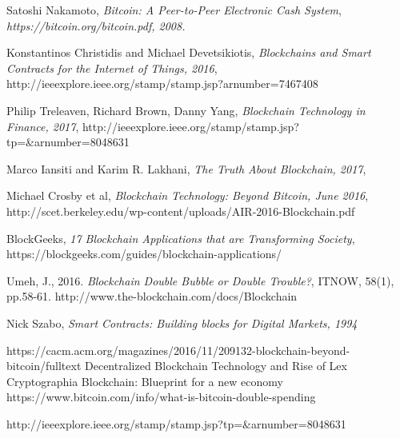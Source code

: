 \documentclass[report]{IEEEtran}
\begin{document}
\begin{thebibliography}{1}

Satoshi Nakamoto, \emph{Bitcoin: A Peer-to-Peer Electronic Cash System}, \em{https://bitcoin.org/bitcoin.pdf, 2008.}

Konstantinos Christidis and Michael Devetsikiotis, \emph{Blockchains and Smart Contracts for the Internet of Things, 2016}, http://ieeexplore.ieee.org/stamp/stamp.jsp?arnumber=7467408

Philip Treleaven, Richard Brown, Danny Yang, \emph{Blockchain Technology in Finance, 2017}, http://ieeexplore.ieee.org/stamp/stamp.jsp?tp=&arnumber=8048631

Marco Iansiti and Karim R. Lakhani, \emph{The Truth About Blockchain, 2017}, %

Michael Crosby et al, \emph{Blockchain Technology: Beyond Bitcoin, June 2016}, http://scet.berkeley.edu/wp-content/uploads/AIR-2016-Blockchain.pdf

BlockGeeks, \emph{17 Blockchain Applications that are Transforming Society}, https://blockgeeks.com/guides/blockchain-applications/

Umeh, J., 2016. \emph{Blockchain Double Bubble or Double Trouble?}, ITNOW, 58(1), pp.58-61.
http://www.the-blockchain.com/docs/Blockchain%

Nick Szabo, \emph{Smart Contracts: Building blocks for Digital Markets, 1994}

https://cacm.acm.org/magazines/2016/11/209132-blockchain-beyond-bitcoin/fulltext
Decentralized Blockchain Technology and Rise of Lex Cryptographia
Blockchain: Blueprint for a new economy
https://www.bitcoin.com/info/what-is-bitcoin-double-spending

http://ieeexplore.ieee.org/stamp/stamp.jsp?tp=&arnumber=8048631
\end{thebibliography}
\end{document}

